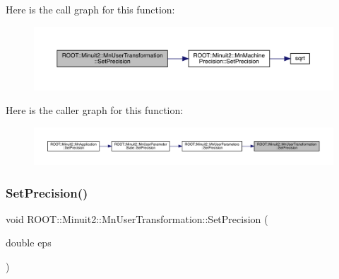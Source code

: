 Here is the call graph for this function\+:
\nopagebreak
\begin{figure}[H]
\begin{center}
\leavevmode
\includegraphics[width=350pt]{d9/d98/classROOT_1_1Minuit2_1_1MnUserTransformation_aa80f289974f19753a2912a8eb6311f53_cgraph}
\end{center}
\end{figure}
Here is the caller graph for this function\+:\nopagebreak
\begin{figure}[H]
\begin{center}
\leavevmode
\includegraphics[width=350pt]{d9/d98/classROOT_1_1Minuit2_1_1MnUserTransformation_aa80f289974f19753a2912a8eb6311f53_icgraph}
\end{center}
\end{figure}
\mbox{\label{classROOT_1_1Minuit2_1_1MnUserTransformation_aa80f289974f19753a2912a8eb6311f53}} 
\subsubsection{\texorpdfstring{SetPrecision()}{SetPrecision()}\hspace{0.1cm}{\footnotesize\ttfamily [2/2]}}
{\footnotesize\ttfamily void R\+O\+O\+T\+::\+Minuit2\+::\+Mn\+User\+Transformation\+::\+Set\+Precision (\begin{DoxyParamCaption}\item[{double}]{eps }\end{DoxyParamCaption})\hspace{0.3cm}{\ttfamily [inline]}}

